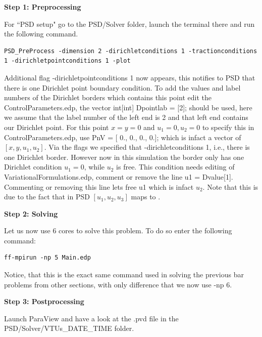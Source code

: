 \documentclass{report}
\begin{document}
\textbf{Step 1: Preprocessing}

For ``PSD setup" go to the {\ttfamily PSD/Solver} folder, launch the terminal there and run the following command.
\begin{lstlisting}[style=Linux]
PSD_PreProcess -dimension 2 -dirichletconditions 1 -tractionconditions 1 -dirichletpointconditions 1 -plot
\end{lstlisting}

Additional flag {\ttfamily -dirichletpointconditions 1} now appears, this notifies to PSD that there is one Dirichlet point boundary condition. To add the values and label numbers of the Dirichlet borders which contains this point edit the  {\ttfamily ControlParameters.edp},  the vector {\ttfamily int[int] Dpointlab = [2];} should be used, here we assume that the label number of the left end is 2 and that left end contains our Dirichlet point. For this point $x=y=0$ and $u_1=0,u_2=0$ to specify this in {\ttfamily ControlParameters.edp}, use {\ttfamily PnV = [ 0., 0., 0., 0.];} which is infact a vector of $[x,y,u_1,u_2]$. Via the flags we specified that {\ttfamily -dirichletconditions 1}, i.e., there is one Dirichlet border. However now in this simulation the border only has one Dirichlet condition $u_1=0$, while $u_2$ is free. This condition needs editing of {\ttfamily VariationalFormulations.edp}, comment or remove the line {\ttfamily u1 = Dvalue[1]}. Commenting or removing this line lets free {\ttfamily u1} which is infact $u_2$. Note that this is due to the fact that in PSD $[u_1,u_2,u_3]$ maps to {\ttfamily [u,u1,u2]}.

\textbf{Step 2: Solving}

Let us now use 6 cores to solve this problem. To do so enter the following command:

\begin{lstlisting}[style=Linux]
ff-mpirun -np 5 Main.edp
\end{lstlisting}
%
Notice, that this is the exact same command used in solving the previous bar problems from other sections, with only difference that we now use {\ttfamily -np 6}.


\textbf{Step 3: Postprocessing}

Launch ParaView and have a look at the  {\ttfamily .pvd} file in the  {\ttfamily PSD/Solver/VTUs\_DATE\_TIME} folder. 
\end{document}
